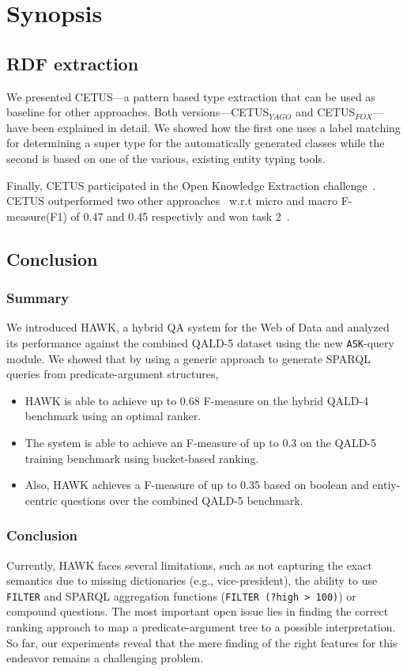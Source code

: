 \chapter{Synopsis}



\section{RDF extraction}
\label{cha321:sec:conclusion}

We presented CETUS---a pattern based type extraction that can be used as baseline for other approaches.
Both versions---CETUS$_{YAGO}$ and CETUS$_{FOX}$---have been explained in detail.
We showed how the first one uses a label matching for determining a super type for the automatically generated classes while the second is based on one of the various, existing entity typing tools.

Finally, CETUS participated in the Open Knowledge Extraction challenge~\cite{okechallenge}.
CETUS outperformed two other approaches~\cite{fred_typing,oak_sheffield} w.r.t  micro and macro F-measure(F1) of 0.47 and 0.45 respectivly and won task 2~\cite{okechallenge}.

\section{Conclusion}
\label{chahawk:sec:conclusion}
\subsection*{Summary}
We introduced HAWK, a hybrid \ac{QA} system for the Web of Data and analyzed its performance against the combined \ac{QALD}-5 dataset using the new \texttt{ASK}-query module. 
We showed that by using a generic approach to generate SPARQL queries from predicate-argument structures, 
\begin{itemize}
\item HAWK is able to achieve up to 0.68 F-measure on the hybrid \ac{QALD}-4 benchmark using an optimal ranker.
\item The system is able to achieve an F-measure of up to 0.3 on the \ac{QALD}-5 training benchmark using bucket-based ranking.
\item Also, HAWK achieves a F-measure of up to 0.35 based on boolean and entiy-centric questions over the combined \ac{QALD}-5 benchmark.
\end{itemize}

\subsection*{Conclusion}
Currently, HAWK faces several limitations, such as not capturing the exact semantics due to missing dictionaries (e.g., vice-president), the ability to use \texttt{FILTER} and SPARQL aggregation functions (\texttt{FILTER (?high > 100)}) or compound questions. 
The most important open issue lies in finding the correct ranking approach to map a predicate-argument tree to a possible interpretation. 
So far, our experiments reveal that the mere finding of the right features for this endeavor remains a challenging problem. 

